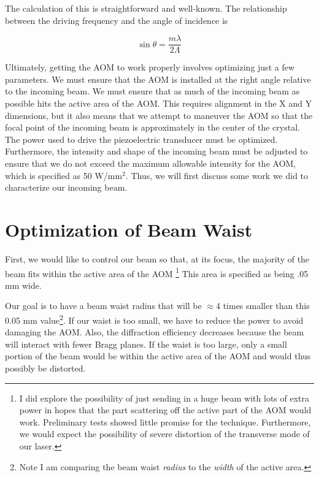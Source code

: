 The calculation of this is straightforward and well-known. The relationship between the driving frequency and the angle of incidence is 


\begin{equation}
\sin{\theta}=\frac{m \lambda}{2 \Lambda}
\end{equation}



Ultimately, getting the AOM to work properly involves optimizing just a few parameters. We must ensure that the AOM is installed at the right angle relative to the incoming beam. We must ensure that as much of the incoming beam as possible hits the active area of the AOM. This requires alignment in the X and Y dimensions, but it also means that we attempt to maneuver the AOM so that the focal point of the incoming beam is approximately in the center of the crystal. The power used to drive the piezoelectric transducer must be optimized. Furthermore, the intensity and shape of the incoming beam must be adjusted to ensure that we do not exceed the maximum allowable intensity for the AOM, which is specified as 50 W/mm$^2$.
Thus, we will first discuss some work we did to characterize our incoming beam.

\section{Optimization of Beam Waist}
First, we would like to control our beam so that, at its focus, the majority of the beam fits within the active area of the AOM \footnote{I did explore the possibility of just sending in a huge beam with lots of extra power in hopes that the part scattering off the active part of the AOM would work. Preliminary tests showed little promise for the technique. Furthermore, we would expect the possibility of severe distortion of the transverse mode of our laser.} This area is specified as being .05 mm wide. 

Our goal is to have a beam waist radius that will be $\approx$4 times smaller than this 0.05 mm value\footnote{Note I am comparing the beam waist \emph{radius} to the \emph{width} of the active area.}. If our waist is too small, we have to reduce the power to avoid damaging the AOM. Also, the diffraction efficiency decreases because the beam will interact with fewer Bragg planes. If the waist is too large, only a small portion of the beam would be within the active area of the AOM and would thus possibly be distorted. 

